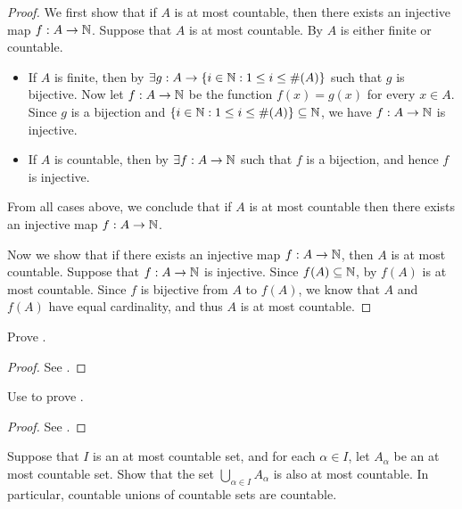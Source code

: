 \begin{proof}
  We first show that if \(A\) is at most countable, then there exists an injective map \(f : A \to \mathbb{N}\).
  Suppose that \(A\) is at most countable.
  By  \(A\) is either finite or countable.
  \begin{itemize}
    \item If \(A\) is finite, then by  \(\exists g : A \to \left\lbrace i \in \mathbb{N} : 1 \leq i \leq \#(A)\right\rbrace\) such that \(g\) is bijective.
          Now let \(f : A \to \mathbb{N}\) be the function \(f(x) = g(x)\) for every \(x \in A\).
          Since \(g\) is a bijection and \(\left\lbrace i \in \mathbb{N} : 1 \leq i \leq \#(A)\right\rbrace \subseteq \mathbb{N}\), we have \(f : A \to \mathbb{N}\) is injective.
    \item If \(A\) is countable, then by  \(\exists f : A \to \mathbb{N}\) such that \(f\) is a bijection, and hence \(f\) is injective.
  \end{itemize}
  From all cases above, we conclude that if \(A\) is at most countable then there exists an injective map \(f : A \to \mathbb{N}\).

  Now we show that if there exists an injective map \(f : A \to \mathbb{N}\), then \(A\) is at most countable.
  Suppose that \(f : A \to \mathbb{N}\) is injective.
  Since \(f(A) \subseteq \mathbb{N}\), by  \(f(A)\) is at most countable.
  Since \(f\) is bijective from \(A\) to \(f(A)\), we know that \(A\) and \(f(A)\) have equal cardinality, and thus \(A\) is at most countable.
\end{proof}

\begin{ex}\label{i:ex:8.1.7}
  Prove .
\end{ex}

\begin{proof}
  See .
\end{proof}

\begin{ex}\label{i:ex:8.1.8}
  Use  to prove .
\end{ex}

\begin{proof}
  See .
\end{proof}

\begin{ex}\label{i:ex:8.1.9}
  Suppose that \(I\) is an at most countable set, and for each \(\alpha \in I\), let \(A_{\alpha}\) be an at most countable set.
  Show that the set \(\bigcup_{\alpha \in I} A_{\alpha}\) is also at most countable.
  In particular, countable unions of countable sets are countable.
\end{ex}

